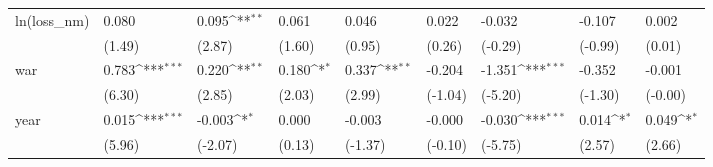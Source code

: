\def\sym#1{\ifmmode^{#1}\else\(^{#1}\)\fi}
\begin{tabular}{p{1.5cm} p{2cm} p{1.7cm} p{1.7cm} p{1.7cm} p{1.7cm} p{1.7cm} p{1.7cm} p{1.7cm}}
\hline
ln(loss\_nm)     &    0.080         &    0.095\sym{**} &    0.061         &    0.046         &    0.022         &   -0.032         &   -0.107         &    0.002         \\
                &   (1.49)         &   (2.87)         &   (1.60)         &   (0.95)         &   (0.26)         &  (-0.29)         &  (-0.99)         &   (0.01)         \\
war             &    0.783\sym{***}&    0.220\sym{**} &    0.180\sym{*}  &    0.337\sym{**} &   -0.204         &   -1.351\sym{***}&   -0.352         &   -0.001         \\
                &   (6.30)         &   (2.85)         &   (2.03)         &   (2.99)         &  (-1.04)         &  (-5.20)         &  (-1.30)         &  (-0.00)         \\
year            &    0.015\sym{***}&   -0.003\sym{*}  &    0.000         &   -0.003         &   -0.000         &   -0.030\sym{***}&    0.014\sym{*}  &    0.049\sym{*}  \\
                &   (5.96)         &  (-2.07)         &   (0.13)         &  (-1.37)         &  (-0.10)         &  (-5.75)         &   (2.57)         &   (2.66)         \\
\end{tabular}
